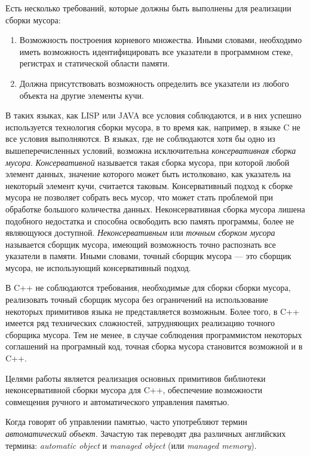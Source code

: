 Есть несколько требований, которые должны быть выполнены для реализации сборки мусора:
\begin{enumerate}
\item Возможность построения корневого множества. Иными словами, необходимо иметь возможность идентифицировать все указатели в программном стеке, регистрах
и статической области памяти.
\item Должна присутствовать возможность определить все указатели из любого объекта на другие элементы кучи.
\end{enumerate}
В таких языках, как LISP или JAVA все условия соблюдаются, и в них успешно используется технология сборки мусора, в то время как, например,
в языке C не все условия выполняются. В языках, где не соблюдаются хотя бы одно из вышеперечисленных условий, возможна исключительна
\textit{консервативная сборка мусора}.
\textit{Консервативной} называется такая сборка мусора, при которой любой элемент данных, значение которого может быть истолковано, как указатель на
некоторый элемент кучи, считается  таковым. Консервативный подход к сборке мусора не позволяет собрать весь мусор, что может стать проблемой при обработке
большого количества данных. Неконсервативная сборка мусора лишена подобного недостатка и способна освободить всю память программы, более не
являющуюся доступной. \textit{Неконсервативным} или  \textit{точным сборком мусора} называется сборщик мусора, имеющий возможность точно распознать
все указатели в памяти. Иными словами, точный сборщик мусора --- это сборщик мусора, не использующий консервативный подход.

В C++ не соблюдаются требования, необходимые для сборки сборки мусора, реализовать точный сборщик мусора без ограничений
на использование некоторых примитивов языка не представляется возможным.
Более того, в C++ имеется ряд технических сложностей, затрудняющих реализацию точного сборщика мусора.
Тем не менее, в случае соблюдения программистом некоторых соглашений на програмный код,
точная сборка мусора становится возможной и в C++.

Целями работы является реализация основных примитивов библиотеки неконсервативной сборки мусора для C++,
обеспечение возможности совмещения ручного и автоматического управления памятью.

Когда говорят об управлении памятью, часто употребляют термин \textit{автоматический объект}.
Зачастую так переводят два различных английских термина: \textit{automatic object} и \textit{managed object} (или
\textit{managed memory}).

